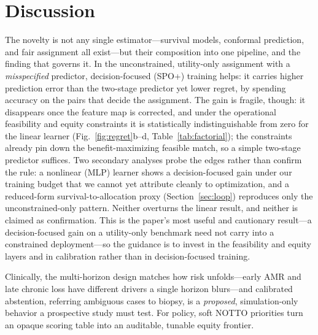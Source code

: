 \documentclass[journal]{IEEEtran}
\begin{document}
\section{Discussion}
\label{sec:discussion}
The novelty is not any single estimator---survival models, conformal prediction, and fair assignment all exist---but their composition into one pipeline, and the finding that governs it. In the unconstrained, utility-only assignment with a \emph{misspecified} predictor, decision-focused (SPO+) training helps: it carries higher prediction error than the two-stage predictor yet lower regret, by spending accuracy on the pairs that decide the assignment. The gain is fragile, though: it disappears once the feature map is corrected, and under the operational feasibility and equity constraints it is statistically indistinguishable from zero for the linear learner (Fig.~\ref{fig:regret}b--d, Table~\ref{tab:factorial}); the constraints already pin down the benefit-maximizing feasible match, so a simple two-stage predictor suffices. Two secondary analyses probe the edges rather than confirm the rule: a nonlinear (MLP) learner shows a decision-focused gain under our training budget that we cannot yet attribute cleanly to optimization, and a reduced-form survival-to-allocation proxy (Section~\ref{sec:loop}) reproduces only the unconstrained-only pattern. Neither overturns the linear result, and neither is claimed as confirmation. This is the paper's most useful and cautionary result---a decision-focused gain on a utility-only benchmark need not carry into a constrained deployment---so the guidance is to invest in the feasibility and equity layers and in calibration rather than in decision-focused training.

Clinically, the multi-horizon design matches how risk unfolds---early AMR and late chronic loss have different drivers a single horizon blurs---and calibrated abstention, referring ambiguous cases to biopsy, is a \emph{proposed}, simulation-only behavior a prospective study must test. For policy, soft NOTTO priorities turn an opaque scoring table into an auditable, tunable equity frontier.
\end{document}
